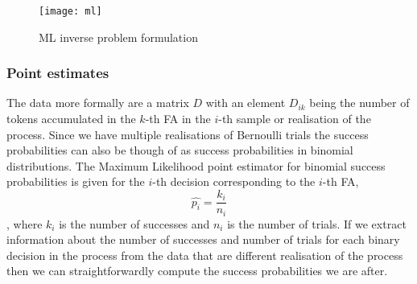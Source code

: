 \begin{figure}[htbp!]
\centering
\texttt{[image: ml]}
\caption[ML inverse problem formulation]{ML inverse problem formulation}
\label{fig:ml}
\end{figure}



\subsubsection{Point estimates}
The data more formally are a matrix $D$ with an element $D_{ik}$ being
the number of tokens accumulated in the $k$-th FA in the $i$-th
sample or realisation of the process. Since we have multiple
realisations of Bernoulli trials the success probabilities can also be
though of as success probabilities in binomial distributions. The
Maximum Likelihood point estimator for binomial success probabilities
is given for the $i$-th decision corresponding to the $i$-th FA,
\begin{equation*}
\hat{p_i} = \frac{k_i}{n_i}
\end{equation*}
, where $k_i$ is the number of successes and $n_i$ is the number of
trials. If we extract information about the number of successes and
number of trials for each binary decision in the process from the data
that are different realisation of the process then we can
straightforwardly compute the success probabilities we are after.

